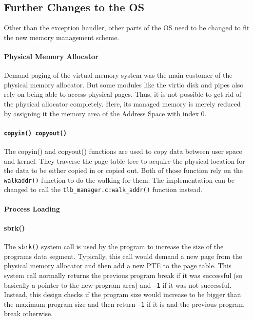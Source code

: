 \subsection{Further Changes to the OS}
Other than the exception handler, other parts of the OS need to be changed to fit the new memory management scheme.

\paragraph{Physical Memory Allocator} %
Demand paging of the virtual memory system was the main customer of the physical memory allocator.
But some modules like the virtio disk and pipes also rely on being able to access physical pages. Thus, it is not
possible to get rid of the physical allocator completely.
Here, its managed memory is merely reduced by assigning it the memory area of the Address Space with index 0.

\paragraph{\texttt{copyin() copyout()}} The copyin() and copyout() functions are used to copy data between
user space and kernel. They traverse the page table tree to acquire the physical location for the data
to be either copied in or copied out.
Both of those function rely on the \texttt{walkaddr()} function to do the walking for them.
The implementation can be changed to call the \texttt{tlb\_manager.c:walk\_addr()} function instead.

\paragraph{Process Loading} %
\paragraph{sbrk()}The \texttt{sbrk()} system call is used by the program to increase the size
of the programs data segment. Typically, this call would demand a new page from the physical memory allocator
and then add a new PTE to the page table.
This system call normally returns the previous program break if it was successful (so basically a pointer to
the new program area) and \texttt{-1} if it was not successful.
Instead, this design checks if the program size would increase to be bigger than the maximum program size and
then return \texttt{-1} if it is and the previous program break otherwise.


